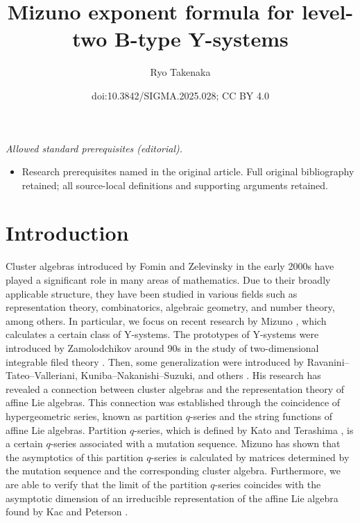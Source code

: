 \documentclass[10pt,a4paper]{amsart}
\title{Mizuno exponent formula for level-two B-type Y-systems}
\author{Ryo Takenaka}
\date{doi:10.3842/SIGMA.2025.028; CC BY 4.0}
\numberwithin{equation}{section}
\begin{document}
\maketitle
\noindent\textit{Allowed standard prerequisites (editorial).}\begin{itemize}
\item Research prerequisites named in the original article. Full original bibliography retained; all source-local definitions and supporting arguments retained.
\end{itemize}\medskip
\section{Introduction}

Cluster algebras introduced by Fomin and Zelevinsky in the early 2000s \cite{FZ,FZ2} have played a significant role in many areas of mathematics.
Due to their broadly applicable structure, they have been studied in various fields such as representation theory, combinatorics, algebraic geometry, and number theory, among others.
In particular, we focus on recent research by Mizuno \cite{M}, which calculates a certain class of Y-systems.
The prototypes of Y-systems were introduced by Zamolodchikov around 90s in the study of two-dimensional integrable filed theory \cite{Z}.
Then, some generalization were introduced by Ravanini--Tateo--Valleriani, Kuniba--Nakanishi--Suzuki, and others \cite{KNS0, RTV}.
His research has revealed a connection between cluster algebras and the representation theory of affine Lie algebras.
This connection was established through the coincidence of hypergeometric series, known as partition $q$-series and the string functions of affine Lie algebras.
Partition $q$-series, which is defined by Kato and Terashima \cite{KT}, is a certain $q$-series associated with a mutation sequence.
Mizuno has shown that the asymptotics of this partition $q$-series is calculated by matrices determined by the mutation sequence and the corresponding cluster algebra.
Furthermore, we are able to verify that the limit of the partition $q$-series coincides with the asymptotic dimension of an irreducible representation of the affine Lie algebra found by Kac and Peterson \cite{KP}.
\end{document}
